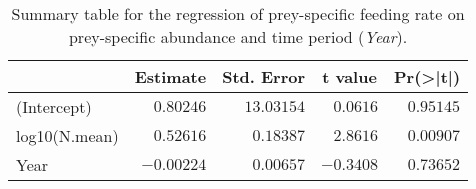 \begin{table}[!htbp]
\caption{Summary table for the regression of 
  prey-specific feeding rate 
  on prey-specific abundance and time period (\emph{Year}).\label{tab:FNY}} 
\begin{center}
\begin{tabular}{lrrrr}
\hline
\multicolumn{1}{l}{}&\multicolumn{1}{c}{Estimate}&\multicolumn{1}{c}{Std. Error}&\multicolumn{1}{c}{t value}&\multicolumn{1}{c}{Pr(\textgreater |t|)}\tabularnewline
\hline
(Intercept)&$ 0.80246$&$13.03154$&$ 0.0616$&$0.95145$\tabularnewline
log10(N.mean)&$ 0.52616$&$ 0.18387$&$ 2.8616$&$0.00907$\tabularnewline
Year&$-0.00224$&$ 0.00657$&$-0.3408$&$0.73652$\tabularnewline
\hline
\end{tabular}\end{center}
\end{table}
